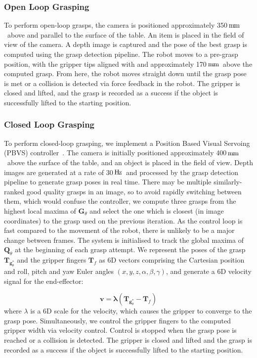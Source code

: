 \documentclass[conference]{IEEEtran}
\newcommand{\pack}	{\hspace{-0.08em}}
\newcommand{\Hz}	{\ensuremath{\rm\,H\pack z}}
\newcommand{\mm}	{\ensuremath{\rm\,m\pack m}}
\newcommand{\cG}{\mathbf{G}}
\newcommand{\cQ}{\mathbf{Q}}
\newcommand{\bg}{\mathbf{g}}
\newcommand{\bT}{\mathbf{T}}
\begin{document}
\subsubsection{Open Loop Grasping}
\label{sec:openloop}

To perform open-loop grasps, the camera is positioned approximately 350\mm~above and parallel to the surface of the table.  An item is placed in the field of view of the camera.  A depth image is captured and the pose of the best grasp is computed using the grasp detection pipeline.  The robot moves to a pre-grasp position, with the gripper tips aligned with and approximately 170\mm~above the computed grasp.  From here, the robot moves straight down until the grasp pose is met or a collision is detected via force feedback in the robot.  The gripper is closed and lifted, and the grasp is recorded as a success if the object is successfully lifted to the starting position.

\subsubsection{Closed Loop Grasping}
\label{sec:closedloop}

To perform closed-loop grasping, we implement a Position Based Visual Servoing (PBVS) controller~\cite{kragic2002survey}.  The camera is initially positioned approximately 400\mm~above the surface of the table, and an object is placed in the field of view.  Depth images are generated at a rate of 30\Hz~and processed by the grasp detection pipeline to generate grasp poses in real time.  There may be multiple similarly-ranked good quality grasps in an image, so to avoid rapidly switching between them, which would confuse the controller, we compute three grasps from the highest local maxima of $\cG_\theta$ and select the one which is closest (in image coordinates) to the grasp  used on the previous iteration.  As the control loop is fast compared to the movement of the robot, there is unlikely to be a major change between frames.  The system is initialised to track the global maxima of $\cQ_\theta$ at the beginning of each grasp attempt.  We represent the poses of the grasp $\bT_{\bg^*_\theta}$ and the gripper fingers $\bT_{f}$ as 6D vectors comprising the Cartesian position and roll, pitch and yaw Euler angles $(x, y, z, \alpha, \beta, \gamma)$, and generate a 6D velocity signal for the end-effector:

\begin{equation*}
    \mathbf{v} = \mathbf{\lambda} (\bT_{\bg^*_\theta} - \bT_{f})
\end{equation*}
where $\lambda$ is a 6D scale for the velocity, which causes the gripper to converge to the grasp pose.  Simultaneously, we control the gripper fingers to the computed gripper width via velocity control.  Control is stopped when the grasp pose is reached or a collision is detected.  The gripper is closed and lifted and the grasp is recorded as a success if the object is successfully lifted to the starting position.
\end{document}
